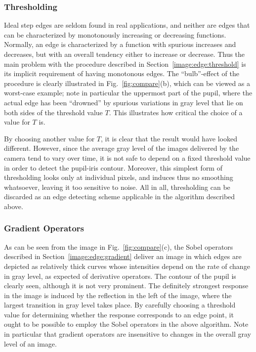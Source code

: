 \subsubsection{Thresholding}

Ideal step edges are seldom found in real applications, and neither
are edges that can be characterized by monotonously increasing or
decreasing functions.  Normally, an edge is characterized by a
function with spurious increases and decreases, but with an overall
tendency either to increase or decrease.  Thus the main problem with
the procedure described in Section~\ref{image:edge:threshold} is its
implicit requirement of having monotonous edges.  The ``bulb''-effect
of the procedure is clearly illustrated in Fig.~\ref{fig:compare}(b),
which can be viewed as a worst-case example; note in particular the
uppermost part of the pupil, where the actual edge has been
``drowned'' by spurious variations in gray level that lie on both
sides of the threshold value $T$.  This illustrates how critical the
choice of a value for $T$ is.

By choosing another value for $T$, it is clear that the result would
have looked different.  However, since the average gray level of the
images delivered by the camera tend to vary over time, it is not safe
to depend on a fixed threshold value in order to detect the pupil-iris
contour.  Moreover, this simplest form of thresholding looks only at
individual pixels, and induces thus no smoothing whatsoever, leaving
it too sensitive to noise.  All in all, thresholding can be discarded
as an edge detecting scheme applicable in the algorithm described
above.

\subsubsection{Gradient Operators}

As can be seen from the image in Fig.~\ref{fig:compare}(c), the Sobel
operators described in Section~\ref{image:edge:gradient} deliver an
image in which edges are depicted as relatively thick curves whose
intensities depend on the rate of change in gray level, as expected of
derivative operators.  The contour of the pupil is clearly seen,
although it is not very prominent.  The definitely strongest response
in the image is induced by the reflection in the left of the image,
where the largest transition in gray level takes place.  By carefully
choosing a threshold value for determining whether the response
corresponds to an edge point, it ought to be possible to employ the
Sobel operators in the above algorithm.  Note in particular that
gradient operators are insensitive to changes in the overall gray
level of an image.


